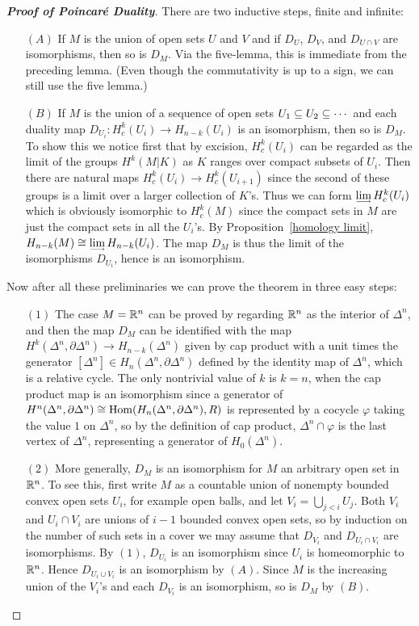 \begin{proof}[\textbf{Proof of Poincar\'e Duality}]
There are two inductive steps, finite and infinite:
\begin{itemize}
\item[$(A)$]If $M$ is the union of open sets $U$ and $V$ and if $D_U$, $D_V$, and $D_{U\cap V}$ are isomorphisms, then so is $D_M$. Via the five-lemma, this is immediate from the preceding lemma. (Even though the commutativity is up to a sign, we can still use the five lemma.)
\item[$(B)$]If $M$ is the union of a sequence of open sets $U_1\subseteq U_2\subseteq\cdots$ and each duality map $D_{U_i}:H^k_c(U_i)\to H_{n-k}(U_i)$ is an isomorphism, then so is $D_M$. To show this we notice first that by excision, $H^k_c(U_i)$ can be regarded as the limit of the groups $H^k(M|K)$ as $K$ ranges over compact subsets of $U_i$. Then there are natural maps $H^k_c(U_i)\to H^k_c(U_{i+1})$ since the second of these groups is a limit over a larger collection of $K$'s. Thus we can form $\rlim H^k_c(U_i)$ which is obviously isomorphic to $H^k_c(M)$ since the compact sets in $M$ are just the compact sets in all the $U_i$'s. By Proposition~\ref{homology limit}, $H_{n-k}(M)\cong\rlim H_{n-k}(U_i)$. The map $D_M$ is thus the limit of the isomorphisms $D_{U_i}$, hence is an isomorphism.
\end{itemize}
Now after all these preliminaries we can prove the theorem in three easy steps:
\begin{itemize}
\item[$(1)$]The case $M=\mathbb{R}^n$ can be proved by regarding $\mathbb{R}^n$ as the interior of $\Delta^n$, and then the map $D_M$ can be identified with the map $H^k(\Delta^n,\partial\Delta^n)\to H_{n-k}(\Delta^n)$ given by cap product with a unit times the generator $[\Delta^n]\in H_n(\Delta^n,\partial\Delta^n)$ defined by the identity map of $\Delta^n$, which is a relative cycle. The only nontrivial value of $k$ is $k=n$, when the cap product map is an isomorphism since a generator of $H^n(\Delta^n,\partial\Delta^n)\cong\mathrm{Hom}(H_n(\Delta^n,\partial\Delta^n),R)$ is represented by a cocycle $\varphi$ taking the value $1$ on $\Delta^n$, so by the definition of cap product, $\Delta^n\cap\varphi$ is the last vertex of $\Delta^n$, representing a generator of $H_0(\Delta^n)$.
\item[$(2)$]More generally, $D_M$ is an isomorphism for $M$ an arbitrary open set in $\mathbb{R}^n$. To see this, first write $M$ as a countable union of nonempty bounded convex open sets $U_i$, for example open balls, and let $V_i=\bigcup_{j<i}U_j$. Both $V_i$ and $U_i\cap V_i$ are unions of $i-1$ bounded convex open sets, so by induction on the number of such sets in a cover we may assume that $D_{V_i}$ and $D_{U_i\cap V_i}$ are isomorphisms. By $(1)$, $D_{U_i}$ is an isomorphism since $U_i$ is homeomorphic to $\mathbb{R}^n$. Hence $D_{U_i\cup V_i}$ is an isomorphism by $(A)$. Since $M$ is the increasing union of the $V_i$'s and each $D_{V_i}$ is an isomorphism, so is $D_M$ by $(B)$.

\end{itemize}
\end{proof}
